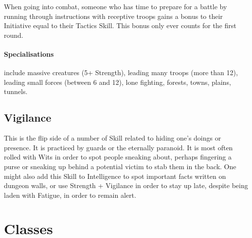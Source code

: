 \begin{multicols}{2}
When going into combat, someone who has time to prepare for a battle by running through instructions with receptive troops gains a bonus to their Initiative equal to their Tactics Skill. This bonus only ever counts for the first \gls{round}.

\paragraph{Specialisations} include massive creatures (5+ Strength), leading many troops (more than 12), leading small forces (between 6 and 12), lone fighting, forests, towns, plains, tunnels.

\subsection{Vigilance}

This is the flip side of a number of Skill related to hiding one's doings or presence.
It is practiced by guards or the eternally paranoid.
It is most often rolled with Wits in order to spot people sneaking about, perhaps fingering a purse or sneaking up behind a potential victim to stab them in the back.
One might also add this Skill to Intelligence to spot important facts written on dungeon walls, or use Strength + Vigilance in order to stay up late, despite being laden with Fatigue, in order to remain alert.

\end{multicols}

\section{Classes}

